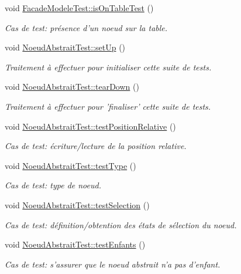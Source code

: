 \begin{DoxyCompactItemize}
void \hyperlink{group__inf2990_gaddc1a794fa60c4a77818bd7ee7a4defe}{Facade\-Modele\-Test\-::is\-On\-Table\-Test} ()
\begin{DoxyCompactList}\small\item\em Cas de test\-: présence d'un noeud sur la table. \end{DoxyCompactList}\item 
void \hyperlink{group__inf2990_ga4d2fe388f550ba374823d09b5c8ebe77}{Noeud\-Abstrait\-Test\-::set\-Up} ()
\begin{DoxyCompactList}\small\item\em Traitement à effectuer pour initialiser cette suite de tests. \end{DoxyCompactList}\item 
void \hyperlink{group__inf2990_ga2c5c558ff7e40386c724a55b670af417}{Noeud\-Abstrait\-Test\-::tear\-Down} ()
\begin{DoxyCompactList}\small\item\em Traitement à effectuer pour 'finaliser' cette suite de tests. \end{DoxyCompactList}\item 
void \hyperlink{group__inf2990_gaed7a5423d2a3a7518aef743f17d32ccd}{Noeud\-Abstrait\-Test\-::test\-Position\-Relative} ()
\begin{DoxyCompactList}\small\item\em Cas de test\-: écriture/lecture de la position relative. \end{DoxyCompactList}\item 
void \hyperlink{group__inf2990_gadf554a62266cc21c7c48f6a27ad7c752}{Noeud\-Abstrait\-Test\-::test\-Type} ()
\begin{DoxyCompactList}\small\item\em Cas de test\-: type de noeud. \end{DoxyCompactList}\item 
void \hyperlink{group__inf2990_gac044744b04574c86418a57b39e3238ff}{Noeud\-Abstrait\-Test\-::test\-Selection} ()
\begin{DoxyCompactList}\small\item\em Cas de test\-: définition/obtention des états de sélection du noeud. \end{DoxyCompactList}\item 
void \hyperlink{group__inf2990_ga0e65b00620e79646a9efd8a93c4fc650}{Noeud\-Abstrait\-Test\-::test\-Enfants} ()
\begin{DoxyCompactList}\small\item\em Cas de test\-: s'assurer que le noeud abstrait n'a pas d'enfant. \end{DoxyCompactList}\item 

\end{DoxyCompactItemize}
